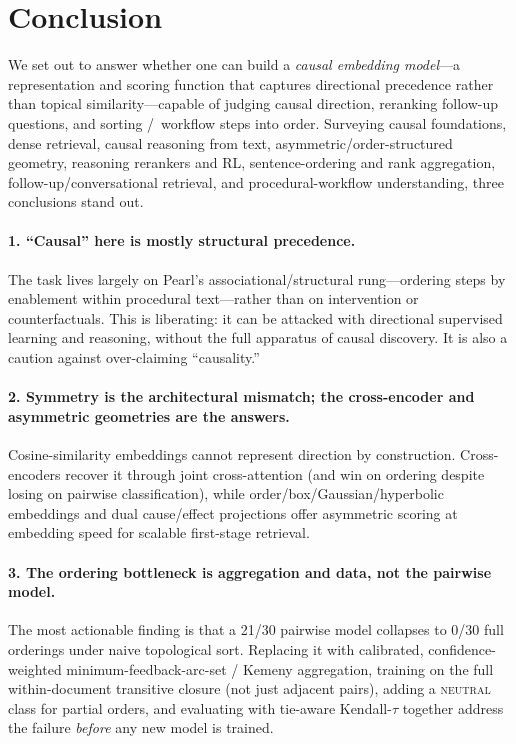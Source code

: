 \section{Conclusion}

We set out to answer whether one can build a \emph{causal embedding model}---a
representation and scoring function that captures directional precedence rather than
topical similarity---capable of judging causal direction, reranking follow-up questions,
and sorting \aep/\ajo\ workflow steps into order. Surveying causal foundations, dense
retrieval, causal reasoning from text, asymmetric/order-structured geometry, reasoning
rerankers and RL, sentence-ordering and rank aggregation, follow-up/conversational
retrieval, and procedural-workflow understanding, three conclusions stand out.

\paragraph{1. ``Causal'' here is mostly structural precedence.} The task lives largely on
Pearl's associational/structural rung---ordering steps by enablement within procedural
text---rather than on intervention or counterfactuals. This is liberating: it can be
attacked with directional supervised learning and reasoning, without the full apparatus
of causal discovery. It is also a caution against over-claiming ``causality.''

\paragraph{2. Symmetry is the architectural mismatch; the cross-encoder and asymmetric
geometries are the answers.} Cosine-similarity embeddings cannot represent direction by
construction. Cross-encoders recover it through joint cross-attention (and win on
ordering despite losing on pairwise classification), while order/box/Gaussian/hyperbolic
embeddings and dual cause/effect projections offer asymmetric scoring at embedding speed
for scalable first-stage retrieval.

\paragraph{3. The ordering bottleneck is aggregation and data, not the pairwise model.}
The most actionable finding is that a 21/30 pairwise model collapses to 0/30 full
orderings under naive topological sort. Replacing it with calibrated, confidence-weighted
minimum-feedback-arc-set / Kemeny aggregation, training on the full within-document
transitive closure (not just adjacent pairs), adding a \textsc{neutral} class for
partial orders, and evaluating with tie-aware Kendall-$\tau$ together address the failure
\emph{before} any new model is trained.

